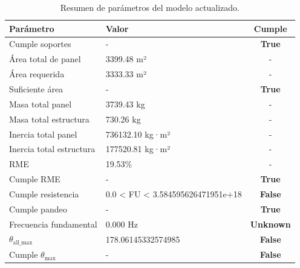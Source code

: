 \begin{table}[H]
    \centering
    \begin{tabular}{|l|l|c|}
    \hline
    \textbf{Parámetro}              & \textbf{Valor}                     & \textbf{Cumple} \\ \hline
    Cumple soportes                 & -                                   & \textbf{True}   \\ \hline
    Área total de panel             & 3399.48 m²                         & -               \\ \hline
    Área requerida                  & 3333.33 m²                         & -               \\ \hline
    Suficiente área                 & -                                   & \textbf{True}   \\ \hline
    Masa total panel                & 3739.43 kg                         & -               \\ \hline
    Masa total estructura           & 730.26 kg                          & -               \\ \hline
    Inercia total panel             & 736132.10 kg·m²                    & -               \\ \hline
    Inercia total estructura        & 177520.81 kg·m²                    & -               \\ \hline
    RME                             & 19.53\%                            & -               \\ \hline
    Cumple RME                      & -                                   & \textbf{True}   \\ \hline
    Cumple resistencia              & 0.0 < FU < 3.584595626471951e+18   & \textbf{False}  \\ \hline
    Cumple pandeo                   & -                                   & \textbf{True}   \\ \hline
    Frecuencia fundamental          & 0.000 Hz                           & \textbf{Unknown}  \\ \hline
    $\theta_\text{all\_max}$        & 178.06145332574985                 & \textbf{False}  \\ \hline
    Cumple $\theta_\text{max}$      & -                                   & \textbf{False}  \\ \hline
    \end{tabular}
    \caption{Resumen de parámetros del modelo actualizado.}
    \label{tabla:modelo_h5_actualizado}
\end{table}
  
